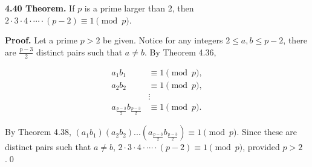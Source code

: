 \documentclass[12pt]{article}
\begin{document}
\noindent\textbf{4.40 Theorem.} If $p$ is a prime larger than 2, then $2\cdot 3\cdot 4\cdot \cdots \cdot (p-2)\equiv 1\pmod p$.

\bigskip

\noindent\textbf{Proof.} Let a prime $p>2$ be given. Notice for any integers $2\leq a,b \leq p-2$, there are $\frac{p-3}{2}$ distinct pairs such that $a\not= b$. By Theorem 4.36,

\begin{align*}
a_1b_1 &\equiv 1\pmod p,\\
a_2b_2 &\equiv 1\pmod p,\\
&\vdots \\
a_{\frac{p-3}{2}}b_{\frac{p-3}{2}} &\equiv 1\pmod p.
\end{align*}

\noindent By Theorem 4.38, $(a_1b_1)(a_2b_2)...(a_{\frac{p-3}{2}}b_{\frac{p-3}{2}})\equiv 1\pmod p$. Since these are distinct pairs such that $a\not= b$, $2\cdot 3\cdot 4\cdot \cdots \cdot (p-2)\equiv 1\pmod p$, provided $p>2$.\qed
\end{document}
